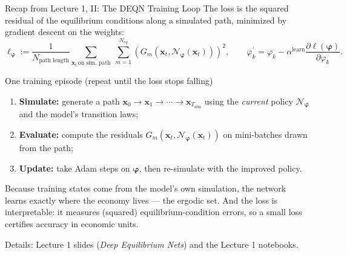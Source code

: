 \documentclass[aspectratio=169,11pt]{beamer}
\newcommand{\emphc}[1]{\textcolor{harvardcrimson}{#1}}
\newcommand{\x}{\bm{x}}
\newcommand{\nn}{\mathcal{N}_{\bm{\varphi}}}
\begin{document}
\begin{frame}{Recap from Lecture 1, II: The DEQN Training Loop}
\footnotesize
The loss is the squared residual of the equilibrium conditions along a simulated path, minimized by gradient descent on the weights:
\[
\ell_{\bm{\varphi}} := \frac{1}{N_{\text{path length}}}\sum_{\x_t \,\text{on sim.\ path}}\ \sum_{m=1}^{N_{eq}}\left(G_{m}(\x_t, \nn(\x_t))\right)^2 ,
\qquad
\varphi^{\prime}_{k}=\varphi_{k} - \alpha^{\text{learn}} \frac{\partial \ell(\bm{\varphi})}{\partial \varphi_{k}} .
\]

\begin{block}{One training episode (repeat until the loss stops falling)}
\begin{enumerate}\itemsep1pt
    \item \textbf{Simulate:} generate a path $\x_0 \to \x_1 \to \cdots \to \x_{T_{\text{sim}}}$ using the \emph{current} policy $\nn$ and the model's transition laws;
    \item \textbf{Evaluate:} compute the residuals $G_m(\x_t, \nn(\x_t))$ on mini-batches drawn from the path;
    \item \textbf{Update:} take Adam steps on $\bm{\varphi}$, then \emphc{re-simulate} with the improved policy.
\end{enumerate}
\end{block}

\vspace{0.1cm}
Because training states come from the model's own simulation, the network learns exactly where the economy lives --- the \emphc{ergodic set}. And the loss is interpretable: it measures (squared) \emphc{equilibrium-condition errors}, so a small loss certifies accuracy in economic units.

\vspace{0.1cm}
{\scriptsize Details: Lecture 1 slides (\emph{Deep Equilibrium Nets}) and the Lecture 1 notebooks.}
\end{frame}
\end{document}

